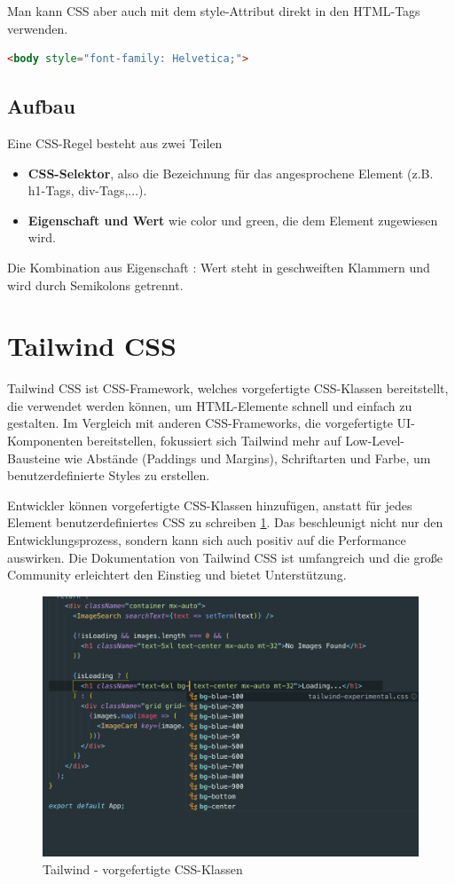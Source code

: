 Man kann CSS aber auch mit dem style-Attribut direkt in den HTML-Tags verwenden.
\begin{lstlisting}[language=html, caption=HTML Beispiel mit CSS]
  <body style="font-family: Helvetica;">
\end{lstlisting}

\subsection*{Aufbau}
Eine CSS-Regel besteht aus zwei Teilen 
\begin{itemize}
  \item {\textbf{CSS-Selektor}, also die Bezeichnung für das angesprochene Element (z.B. h1-Tags, div-Tags,...). }
  \item {\textbf{Eigenschaft und Wert} wie color und green, die dem Element zugewiesen wird.  }
\end{itemize}
Die Kombination aus Eigenschaft : Wert steht in geschweiften Klammern und wird durch
Semikolons getrennt. 
\newpage

\section{Tailwind CSS} \label{TailwindCSS}
Tailwind CSS ist CSS-Framework, welches vorgefertigte CSS-Klassen bereitstellt, die verwendet 
werden können, um HTML-Elemente schnell und einfach zu gestalten. Im Vergleich mit anderen CSS-Frameworks, 
die vorgefertigte UI-Komponenten bereitstellen, fokussiert sich Tailwind mehr auf Low-Level-Bausteine wie 
Abstände (Paddings und Margins), Schriftarten und Farbe, um benutzerdefinierte Styles zu erstellen.

Entwickler können vorgefertigte CSS-Klassen hinzufügen, anstatt für jedes Element benutzerdefiniertes CSS zu 
schreiben \ref{fig:Tailwind}. Das beschleunigt nicht nur den Entwicklungsprozess, sondern kann sich auch positiv auf die Performance 
auswirken. Die Dokumentation von Tailwind CSS ist umfangreich und die große Community erleichtert den Einstieg und 
bietet Unterstützung.\cite{APCW20016}

\begin{figure}[ht!]
    \includegraphics[width=.94\textwidth]{pics/tailwindCSS-class-showcase.png}
    \caption{\label{fig:Tailwind}Tailwind - vorgefertigte CSS-Klassen \cite{APCW20017}}
  \end{figure}

